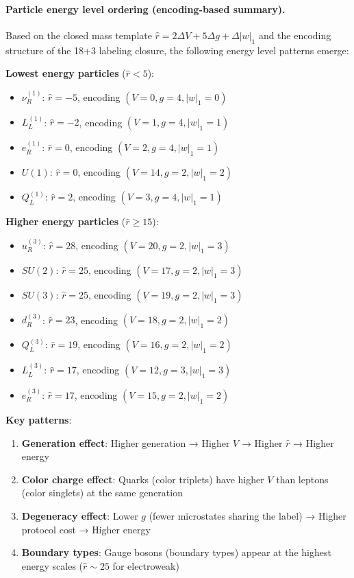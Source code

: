 \paragraph{Particle energy level ordering (encoding-based summary).}
\AuditTag Based on the closed mass template $\widehat{r}=2\Delta V+5\Delta g+\Delta|w|_1$ and the encoding structure of the 18+3 labeling closure, the following energy level patterns emerge:

\textbf{Lowest energy particles} ($\widehat{r}<5$):
\begin{itemize}
\item $\nu_R^{(1)}$: $\widehat{r}=-5$, encoding $(V=0, g=4, |w|_1=0)$
\item $L_L^{(1)}$: $\widehat{r}=-2$, encoding $(V=1, g=4, |w|_1=1)$
\item $e_R^{(1)}$: $\widehat{r}=0$, encoding $(V=2, g=4, |w|_1=1)$
\item $U(1)$: $\widehat{r}=0$, encoding $(V=14, g=2, |w|_1=2)$
\item $Q_L^{(1)}$: $\widehat{r}=2$, encoding $(V=3, g=4, |w|_1=1)$
\end{itemize}

\textbf{Higher energy particles} ($\widehat{r}\geq 15$):
\begin{itemize}
\item $u_R^{(3)}$: $\widehat{r}=28$, encoding $(V=20, g=2, |w|_1=3)$
\item $SU(2)$: $\widehat{r}=25$, encoding $(V=17, g=2, |w|_1=3)$
\item $SU(3)$: $\widehat{r}=25$, encoding $(V=19, g=2, |w|_1=3)$
\item $d_R^{(3)}$: $\widehat{r}=23$, encoding $(V=18, g=2, |w|_1=2)$
\item $Q_L^{(3)}$: $\widehat{r}=19$, encoding $(V=16, g=2, |w|_1=2)$
\item $L_L^{(3)}$: $\widehat{r}=17$, encoding $(V=12, g=3, |w|_1=3)$
\item $e_R^{(3)}$: $\widehat{r}=17$, encoding $(V=15, g=2, |w|_1=2)$
\end{itemize}

\textbf{Key patterns}:
\begin{enumerate}
\item \textbf{Generation effect}: Higher generation → Higher $V$ → Higher $\widehat{r}$ → Higher energy
\item \textbf{Color charge effect}: Quarks (color triplets) have higher $V$ than leptons (color singlets) at the same generation
\item \textbf{Degeneracy effect}: Lower $g$ (fewer microstates sharing the label) → Higher protocol cost → Higher energy
\item \textbf{Boundary types}: Gauge bosons (boundary types) appear at the highest energy scales ($\widehat{r}\sim 25$ for electroweak)
\end{enumerate}